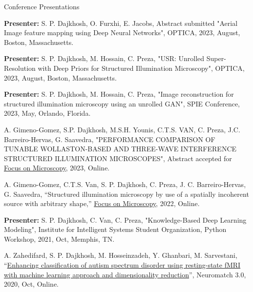 \begin{cventries}
  \cventry
    {} %
    {Conference Presentations} %
    {} %
    {} %
    {
        \begin{cvitems} %
      \item{\textbf{Presenter:} S. P. Dajkhosh, O. Furxhi,  E. Jacobs, Abstract submitted "Aerial Image feature mapping using Deep Neural Networks", OPTICA, 2023, August, Boston, Massachusetts.}
      \item{\textbf{Presenter:} S. P. Dajkhosh, M. Hossain,  C. Preza, "USR: Unrolled Super-Resolution with Deep Priors for Structured Illumination Microscopy", OPTICA, 2023, August, Boston, Massachusetts.}
        \item{\textbf{Presenter:} S. P. Dajkhosh, M. Hossain, C. Preza, "Image reconstruction for structured illumination microscopy using an unrolled GAN", SPIE Conference, 2023, May, Orlando, Florida.}
        \item{A. Gimeno-Gomez, S.P. Dajkhosh, M.S.H. Younis, C.T.S. VAN, C. Preza, J.C. Barreiro-Hervas, G. Saavedra, "PERFORMANCE COMPARISON OF TUNABLE WOLLASTON-BASED AND THREE-WAVE INTERFERENCE STRUCTURED ILLUMINATION MICROSCOPES", Abstract accepted for \href{https://www.focusonmicroscopy.org/}{Focus on Microscopy}, 2023, Online.}
        \item{A. Gimeno-Gomez, C.T.S. Van, S. P. Dajkhosh, C. Preza, J. C. Barreiro-Hervas, G. Saavedra, “Structured illumination microscopy by use of a spatially incoherent source with arbitrary shape,” \href{https://www.focusonmicroscopy.org/}{Focus on Microscopy}, 2022, Online.}
        \item{\textbf{Presenter: }S. P. Dajkhosh, C. Van, C. Preza, "Knowledge-Based Deep Learning Modeling", Institute for Intelligent Systems Student Organization, Python Workshop, 2021, Oct, Memphis, TN.}
        \item{A. Zahedifard, S. P. Dajkhosh, M. Hosseinzadeh, Y. Ghanbari, M. Sarvestani, “\href{https://neural-reckoning.github.io/nmc3_provisional_schedule/abstracts/anis-zahedifard-enhancing-classification-of-autism-spectrum.html}{Enhancing classification of autism spectrum disorder using resting-state fMRI with machine learning approach and dimensionality reduction}”, Neuromatch 3.0, 2020, Oct, Online.}
      \end{cvitems}
    }



\end{cventries}
